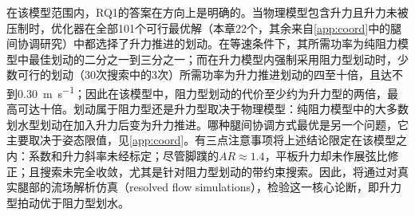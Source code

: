在该模型范围内，RQ1的答案在方向上是明确的。当物理模型包含升力且升力未被压制时，优化器在全部101个可行最优解（本章22个，其余来自\cref{app:coord}中的腿间协调研究）中都选择了升力推进的划动。在等速条件下，其所需功率为纯阻力模型中最佳划动的二分之一到三分之一；而在升力模型内强制采用阻力型划动时，少数可行的划动（30次搜索中的3次）所需功率为升力推进划动的四至十倍，且达不到\SI{0.30}{\metre\per\second}；因此在该模型中，阻力型划动的代价至少约为升力型的两倍，最高可达十倍。划动属于阻力型还是升力型取决于物理模型：纯阻力模型中的大多数划水型划动在加入升力后变为升力推进。哪种腿间协调方式最优是另一个问题，它主要取决于姿态限值，见\cref{app:coord}。有三点注意事项将上述结论限定在该模型之内：系数和升力斜率未经标定；尽管脚蹼的$\mathit{AR}\approx1.4$，平板升力却未作展弦比修正；且搜索未完全收敛，尤其是针对阻力型划动的带约束搜索。因此，将通过对真实腿部的流场解析仿真（resolved flow simulations），检验这一核心论断，即升力型拍动优于阻力型划水。

